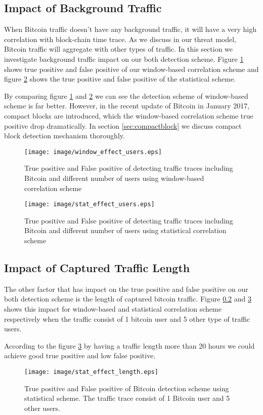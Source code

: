 \subsection{Impact of Background Traffic}
\par When Bitcoin traffic doesn't have any background traffic, it will have a very high correlation with block-chain time trace. As we discuss in our threat model, Bitcoin traffic will aggregate with other types of traffic. In this section we investigate background traffic impact on our both detection scheme. Figure \ref{fig:window_effect_users} shows true positive and false positive of our window-based correlation scheme and figure \ref{fig:stat_effect_users} shows the true positive and false positive of the statistical scheme. 
\par By comparing figure \ref{fig:window_effect_users} and \ref{fig:stat_effect_users} we can see the detection scheme of window-based scheme is far better. However, in the recent update of Bitcoin in January 2017, compact blocks are introduced, which the window-based correlation scheme true positive drop dramatically. In section \ref{sec:compactblock} we discuss compact block detection mechanism thoroughly. 
\begin{figure}
\centering
\texttt{[image: image/window\_effect\_users.eps]}
\caption{True positive and False positive of detecting traffic traces including Bitcoin and different number of users using window-based correlation scheme}
\label{fig:window_effect_users}
\end{figure}

\begin{figure}
\centering
\texttt{[image: image/stat\_effect\_users.eps]}
\caption{True positive and False positive of detecting traffic traces including Bitcoin and different number of users using statistical correlation scheme}
\label{fig:stat_effect_users}
\end{figure}
\subsection{Impact of Captured Traffic Length}
The other factor that has impact on the true positive and false positive on our both detection scheme is the length of captured bitcoin traffic. Figure \ref{} and \ref{fig:stat_effect_length} shows this impact for window-based and statistical  correlation scheme respectively when the traffic consist of 1 bitcoin user and 5 other type of traffic users. 
\par According to the figure \ref{fig:stat_effect_length} by having a traffic length more than 20 hours we could achieve good true positive and low false positive. 
\begin{figure}
\centering
\texttt{[image: image/stat\_effect\_length.eps]}
\caption{True positive and False positive of Bitcoin detection scheme using statistical scheme. The traffic trace consist of 1 Bitcoin user and 5 other users.}
\label{fig:stat_effect_length}
\end{figure}

